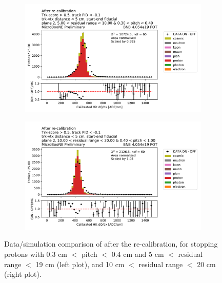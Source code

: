 \begin{figure}[H] 
\begin{center}
    \begin{subfigure}[b]{0.45\textwidth}
    \centering
    \includegraphics[width=1.00\textwidth]{stopping_muons_protons/protons_500_residualrange_1000_030_pitch_040depois.pdf}
    \end{subfigure}
    \begin{subfigure}[b]{0.45\textwidth}
    \centering
    \includegraphics[width=1.00\textwidth]{stopping_muons_protons/protons_1000_residual_range_2000_040_pitch_100depois.pdf}
    \end{subfigure}
\caption{Data/simulation comparison of \dqdx after the re-calibration, for stopping protons with 0.3 cm $<$ pitch $<$ 0.4 cm and 5 cm $<$ residual range $<$ 19 cm (left plot), and 10 cm $<$ residual range $<$ 20 cm (right plot).}
\label{fig:stopping_protons_recombination}
\end{center}
\end{figure}
